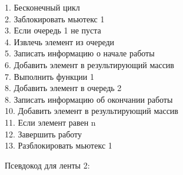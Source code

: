 \documentclass[a4paper,12pt]{article}
\begin{document}
\begin{flushleft}
	1. Бесконечный цикл\\
		2. \hspace{1.5cm} Заблокировать мьютекс 1\\
		3. \hspace{1.5cm} Если очередь 1 не пуста\\
		4. \hspace{3cm} Извлечь элемент из очереди\\
		5. \hspace{3cm} Записать информацию о начале работы\\
		6. \hspace{3cm} Добавить элемент в результирующий массив\\
		7. \hspace{3cm} Выполнить функции 1\\
		8. \hspace{3cm} Добавить элемент в очередь 2\\
		8. \hspace{3cm} Записать информацию об окончании работы\\
		10. \hspace{3cm} Добавить элемент в результирующий массив\\
		11. \hspace{3cm} Если элемент равен n\\
		12. \hspace{4.5cm} Завершить работу\\
		13. \hspace{1.5cm} Разблокировать мьютекс 1\\
\end{flushleft}

Псевдокод для ленты 2:
\end{document}
